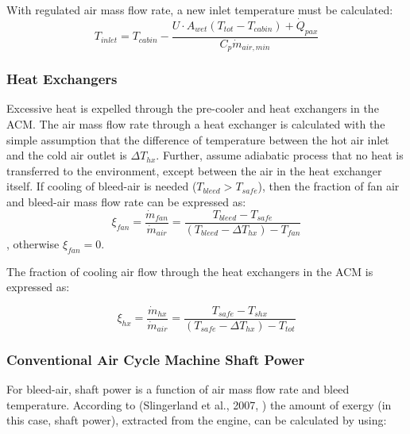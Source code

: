 \documentclass[english]{kththesis}
\begin{document}
With regulated air mass flow rate, a new inlet temperature must be calculated:
\begin{equation}
\label{eq:ACMTinlet}
T_{inlet} = T_{cabin} - \frac{U \cdot A_{wet} (T_{tot}-T_{cabin}) + \dot{Q}_{pax}}{C_p \dot{m}_{air,min}}
\end{equation}

\subsubsection{Heat Exchangers}
\label{subsubsec:ACMHx}
Excessive heat is expelled through the pre-cooler and heat exchangers in the ACM.
The air mass flow rate through a heat exchanger is calculated with the simple assumption that the difference of temperature between the hot air inlet and the cold air outlet is $\Delta T_{hx}$. Further, assume adiabatic process that no heat is transferred to the environment, except between the air in the heat exchanger itself.
If cooling of bleed-air is needed ($T_{bleed}>T_{safe}$), then the fraction of fan air and bleed-air mass flow rate can be expressed as:
\begin{equation}
\label{eq:FanXi}
\xi_{fan} = \frac{\dot{m}_{fan}}{\dot{m}_{air}} = \frac{T_{bleed}-T_{safe}}{(T_{bleed}-\Delta T_{hx})-T_{fan}}
\end{equation}
, otherwise $\xi_{fan}=0$.


The fraction of cooling air flow through the heat exchangers in the ACM is expressed as:

\begin{equation}
\label{eq:ACMHx}
\xi_{hx} = \frac{\dot{m}_{hx}}{\dot{m}_{air}} = \frac{T_{safe}-T_{shx}}{(T_{safe}-\Delta T_{hx})-T_{tot}}
\end{equation}



\subsubsection{Conventional Air Cycle Machine Shaft Power}
\label{subsubsec:ACMShaftPower}

For bleed-air, shaft power is a function of air mass flow rate and bleed temperature. According to (Slingerland et al., 2007, \cite{Slingerland2007}) the amount of exergy (in this case, shaft power), extracted from the engine, can be calculated by using:
\end{document}
